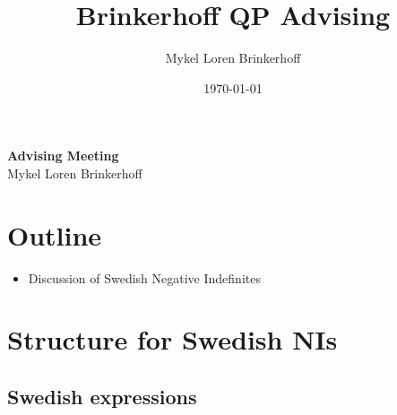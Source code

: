 \documentclass[12pt, letterpaper]{article}
\title{Brinkerhoff QP Advising}
\author{Mykel Loren Brinkerhoff}
\date{\today}
\begin{document}
	
	\setlength{\Extopsep}{6pt}
	\setlength{\Exlabelsep}{9pt}		%
	
\singlespacing
	
\begin{center}
	{\Large \textbf{Advising Meeting}}\\
	\vspace{6pt}
	Mykel Loren Brinkerhoff
\end{center}
\thispagestyle{fancy}

\section*{Outline} \label{sec:outline}
\begin{itemize}
	\item Discussion of Swedish Negative Indefinites
\end{itemize}


\section*{Structure for Swedish NIs} \label{sec:structure}


\subsection*{Swedish expressions} \label{sec:diagnositics}
\end{document}
